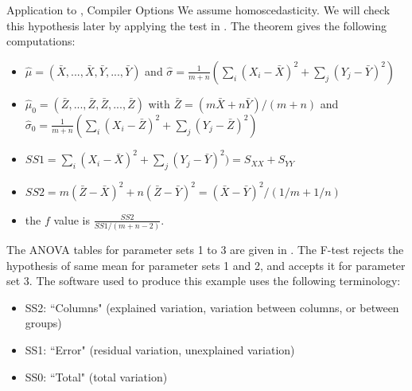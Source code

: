 \begin{ex}{Application to , Compiler Options}
We assume homoscedasticity. We will check this hypothesis later
by applying the test in . The theorem gives
the following computations:
\begin{itemize}
  \item
      $\hat{\mu}=(\bar{X},...,\bar{X},\bar{Y},...,\bar{Y})$
      and $\hat{\sigma}=\frac{1}{m+n}(\sum_i(X_i-\bar{X})^2
      +\sum_j(Y_j-\bar{Y})^2) $
  \item
      $\hat{\mu}_0=(\bar{Z},...,\bar{Z},\bar{Z},...,\bar{Z})$
      with $\bar{Z}=(m\bar{X}+n\bar{Y})/(m+n)$ and
      $\hat{\sigma}_0=\frac{1}{m+n}(\sum_i(X_i-\bar{Z})^2
      +\sum_j(Y_j-\bar{Z})^2)$
  \item $SS1 = \sum_i(X_i-\bar{X})^2   +\sum_j(Y_j-\bar{Y})^2)=S_{XX}+S_{YY}$
  \item $SS2 = m (\bar{Z}-\bar{X})^2 + n (\bar{Z}-\bar{Y})^2 = (\bar{X}-\bar{Y})^2/(1/m+ 1/n)$
  \item the $f$ value is $\frac{SS2}{SS1/(m+n-2)}$.
\end{itemize}

The ANOVA tables for parameter sets 1 to 3 are given in
.  The F-test rejects the hypothesis of same
mean for parameter sets 1 and 2, and accepts it for parameter set
3. The software used to produce this example uses the following
terminology:\begin{itemize}
    \item SS2: ``Columns" (explained variation, variation between columns, or between
    groups)
    \item SS1: ``Error" (residual variation, unexplained
    variation)
    \item SS0: ``Total" (total variation)
\end{itemize}\label{ex-anova-npd48}
\end{ex}




